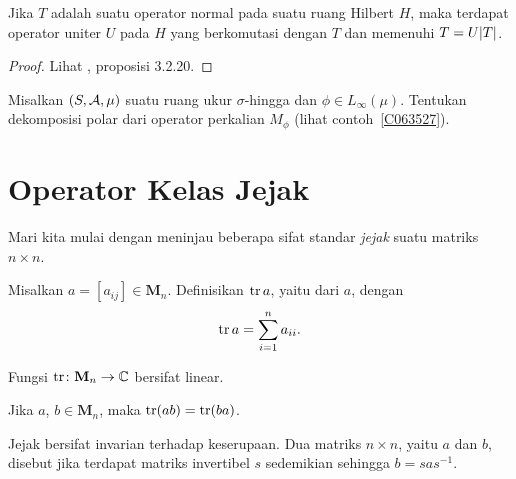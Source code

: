 \begin{prop} Jika $T$ adalah suatu
operator normal pada suatu ruang Hilbert $H$, maka terdapat operator uniter $U$ pada $H$
yang berkomutasi dengan $T$ dan memenuhi $T = U\lvert T\rvert$.
\end{prop}

\begin{proof} Lihat \cite{Pedersen:1995}, proposisi 3.2.20.\ns \end{proof}

\begin{exer} Misalkan $(S, \mathcal{A},\mu)$ suatu ruang ukur $\sigma$-hingga dan $\phi \in
L_\infty(\mu)$. Tentukan dekomposisi polar dari
operator perkalian $M_\phi$ (lihat contoh~\ref{C063527}).
\end{exer}









\section{Operator Kelas Jejak}

Mari kita mulai dengan meninjau beberapa sifat standar \emph{jejak} suatu matriks $n \times n$.

\begin{defn}\label{tr0113} Misalkan $a = [a_{ij}] \in \mathbf M_n$. Definisikan $\operatorname{tr} a$, yaitu
 dari $a$, dengan
  \[ \operatorname{tr} a = \sum_{i = 1}^n a_{ii}. \]
\end{defn}

\begin{prop}\label{tr0117} Fungsi $\operatorname{tr}\colon \mathbf M_n \rightarrow \mathbb{C}$ bersifat linear.
\end{prop}

\begin{prop}\label{tr0121} Jika $a$, $b \in \mathbf M_n$, maka $\operatorname{tr} (ab) = \operatorname{tr} (ba)$.
\end{prop}

Jejak bersifat invarian terhadap keserupaan. Dua matriks $n \times n$, yaitu $a$ dan $b$, disebut
 jika terdapat matriks invertibel $s$ sedemikian sehingga $b = sas^{-1}$.

